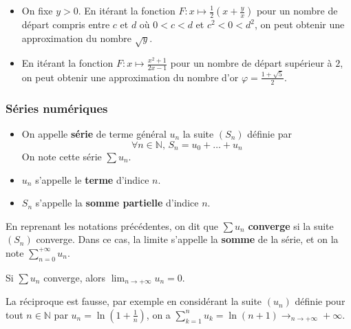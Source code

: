   \begin{example}
    \begin{itemize}
      \item On fixe $y > 0$. En itérant la fonction $F : x \mapsto \frac{1}{2} \left( x + \frac{y}{x} \right)$ pour un nombre de départ compris entre $c$ et $d$ où $0 < c < d$ et $c^2 < 0 < d^2$, on peut obtenir une approximation du nombre $\sqrt{y}$.
      \item En itérant la fonction $F : x \mapsto \frac{x^2+1}{2x-1}$ pour un nombre de départ supérieur à $2$, on peut obtenir une approximation du nombre d'or $\varphi = \frac{1+\sqrt{5}}{2}$.
    \end{itemize}
  \end{example}

  \subsubsection{Séries numériques}

  \label{223-3}


  \begin{definition}
    \begin{itemize}
      \item On appelle \textbf{série} de terme général $u_n$ la suite $(S_n)$ définie par
      \[ \forall n \in \mathbb{N}, \, S_n = u_0 + \dots + u_n \]
      On note cette série $\sum u_n$.
      \item $u_n$ s'appelle le \textbf{terme} d'indice $n$.
      \item $S_n$ s'appelle la \textbf{somme partielle} d'indice $n$.
    \end{itemize}
  \end{definition}

  \begin{definition}
    En reprenant les notations précédentes, on dit que $\sum u_n$ \textbf{converge} si la suite $(S_n)$ converge. Dans ce cas, la limite s'appelle la \textbf{somme} de la série, et on la note $\sum_{n=0}^{+\infty} u_n$.
  \end{definition}


  \begin{proposition}
    Si $\sum u_n$ converge, alors $\lim_{n \rightarrow +\infty} u_n = 0$.
  \end{proposition}

  \begin{cexample}
    La réciproque est fausse, par exemple en considérant la suite $(u_n)$ définie pour tout $n \in \mathbb{N}$ par $u_n = \ln(1 + \frac{1}{n})$, on a $\sum_{k=1}^{n} u_k = \ln(n+1) \longrightarrow_{n \rightarrow +\infty} +\infty$.
  \end{cexample}

